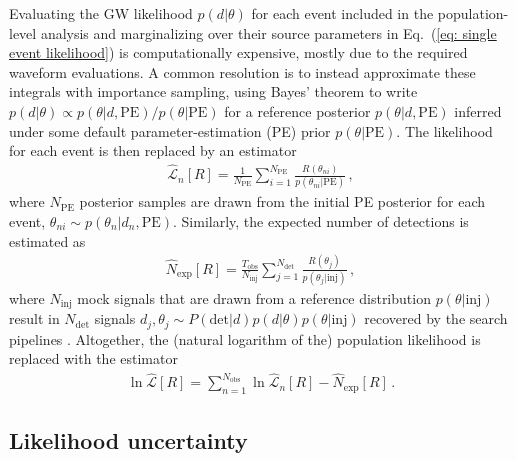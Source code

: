 \begin{refsection}
Evaluating the GW likelihood $p(d|\theta)$ for each event included in the population-level analysis and marginalizing over their source parameters in Eq.~(\ref{eq: single event likelihood}) is computationally expensive, mostly due to the required waveform evaluations. A common resolution is to instead approximate these integrals with importance sampling, using Bayes' theorem to write $p(d|\theta) \propto p(\theta|d,\mathrm{PE}) / p(\theta|\mathrm{PE})$ for a reference posterior $p(\theta|d,\mathrm{PE})$ inferred under some default parameter-estimation (PE) prior $p(\theta|\mathrm{PE})$. The likelihood for each event is then replaced by an estimator
\begin{align}
\label{eq: single event likelihood estimator}
\hat{\mathcal{L}}_n[R]
=
\frac { 1 } { N_\mathrm{PE} }
\sum_{i=1}^{N_\mathrm{PE}}
\frac { R ( \theta_{ni} ) } { p ( \theta_{ni} | \mathrm{PE} ) }
\, ,
\end{align}
where $N_\mathrm{PE}$ posterior samples are drawn from the initial PE posterior for each event, $\theta_{ni} \sim p(\theta_n|d_n,\mathrm{PE})$.
Similarly, the expected number of detections is estimated as 
\begin{align}
\hat{N}_\mathrm{exp}[R]
=
\frac { T_\mathrm{obs} } { N_\mathrm{inj} }
\sum_{j=1}^{N_\mathrm{det}}
\frac { R ( \theta_j ) } { p ( \theta_j | \mathrm{inj} ) }
\, ,
\label{eq: Nexp estimator}
\end{align}
where $N_\mathrm{inj}$ mock signals that are drawn from a reference distribution $p(\theta|\mathrm{inj})$ result in $N_\mathrm{det}$ signals $d_j,\theta_j \sim P(\mathrm{det}|d) p(d|\theta) p(\theta|\mathrm{inj})$ recovered by the search pipelines \cite{Tiwari:2017ndi,Farr:2019rap}. Altogether, the (natural logarithm of the) population likelihood is replaced with the estimator
\begin{align}
\label{eq: total ln likelihood estimator}
\ln \hat{\mathcal{L}}[R]
=
\sum_{n=1}^{N_\mathrm{obs}}
\ln \hat{\mathcal{L}}_n[R]
-
\hat{N}_\mathrm{exp}[R]
\, .
\end{align}


\subsection{Likelihood uncertainty}
\label{sec: ppmethods Likelihood uncertainty}


\end{refsection}
